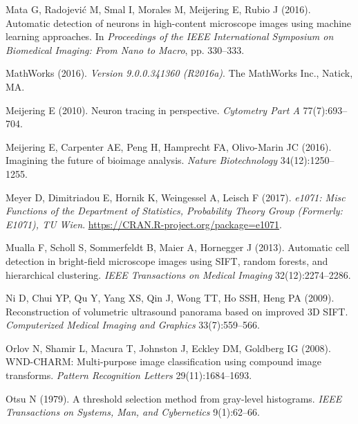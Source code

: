 \begin{thebibliography}{110}
Mata G, Radojevi\'c M, Smal I, Morales M, Meijering E, Rubio J (2016).
  Automatic detection of neurons in high-content microscope images using
  machine learning approaches. In \emph{Proceedings of the IEEE International
  Symposium on Biomedical Imaging: From Nano to Macro}, pp. 330--333.

MathWorks (2016). \emph{Version 9.0.0.341360 (R2016a)}. The MathWorks Inc.,
  Natick, MA.

Meijering E (2010). Neuron tracing in perspective. \emph{Cytometry Part A}
  77(7):693--704.

Meijering E, Carpenter AE, Peng H, Hamprecht FA, Olivo-Marin JC (2016).
  Imagining the future of bioimage analysis. \emph{Nature Biotechnology}
  34(12):1250--1255.

Meyer D, Dimitriadou E, Hornik K, Weingessel A, Leisch F (2017).
\newblock \emph{e1071: Misc Functions of the Department of Statistics,
  Probability Theory Group (Formerly: E1071), TU Wien}.
  \urlprefix\url{https://CRAN.R-project.org/package=e1071}.

Mualla F, Scholl S, Sommerfeldt B, Maier A, Hornegger J (2013). Automatic cell
  detection in bright-field microscope images using {SIFT}, random forests, and
  hierarchical clustering. \emph{IEEE Transactions on Medical Imaging}
  32(12):2274--2286.

Ni D, Chui YP, Qu Y, Yang XS, Qin J, Wong TT, Ho SSH, Heng PA (2009).
  Reconstruction of volumetric ultrasound panorama based on improved {3D}
  {SIFT}. \emph{Computerized Medical Imaging and Graphics} 33(7):559--566.

Orlov N, Shamir L, Macura T, Johnston J, Eckley DM, Goldberg IG (2008).
  {WND-CHARM}: Multi-purpose image classification using compound image
  transforms. \emph{Pattern Recognition Letters} 29(11):1684--1693.

Otsu N (1979). A threshold selection method from gray-level histograms.
  \emph{IEEE Transactions on Systems, Man, and Cybernetics} 9(1):62--66.


\end{thebibliography}
